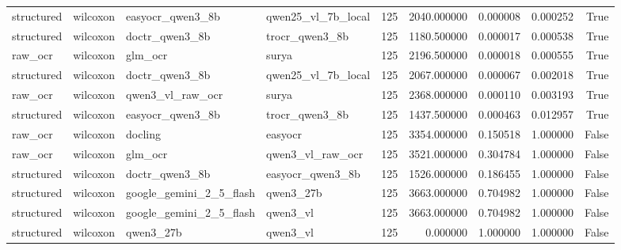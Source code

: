 \begin{tabular}{llllrrrrr}
structured & wilcoxon & easyocr\_qwen3\_8b & qwen25\_vl\_7b\_local & 125 & 2040.000000 & 0.000008 & 0.000252 & True \\
structured & wilcoxon & doctr\_qwen3\_8b & trocr\_qwen3\_8b & 125 & 1180.500000 & 0.000017 & 0.000538 & True \\
raw\_ocr & wilcoxon & glm\_ocr & surya & 125 & 2196.500000 & 0.000018 & 0.000555 & True \\
structured & wilcoxon & doctr\_qwen3\_8b & qwen25\_vl\_7b\_local & 125 & 2067.000000 & 0.000067 & 0.002018 & True \\
raw\_ocr & wilcoxon & qwen3\_vl\_raw\_ocr & surya & 125 & 2368.000000 & 0.000110 & 0.003193 & True \\
structured & wilcoxon & easyocr\_qwen3\_8b & trocr\_qwen3\_8b & 125 & 1437.500000 & 0.000463 & 0.012957 & True \\
raw\_ocr & wilcoxon & docling & easyocr & 125 & 3354.000000 & 0.150518 & 1.000000 & False \\
raw\_ocr & wilcoxon & glm\_ocr & qwen3\_vl\_raw\_ocr & 125 & 3521.000000 & 0.304784 & 1.000000 & False \\
structured & wilcoxon & doctr\_qwen3\_8b & easyocr\_qwen3\_8b & 125 & 1526.000000 & 0.186455 & 1.000000 & False \\
structured & wilcoxon & google\_gemini\_2\_5\_flash & qwen3\_27b & 125 & 3663.000000 & 0.704982 & 1.000000 & False \\
structured & wilcoxon & google\_gemini\_2\_5\_flash & qwen3\_vl & 125 & 3663.000000 & 0.704982 & 1.000000 & False \\
structured & wilcoxon & qwen3\_27b & qwen3\_vl & 125 & 0.000000 & 1.000000 & 1.000000 & False \\
\bottomrule
\end{tabular}
